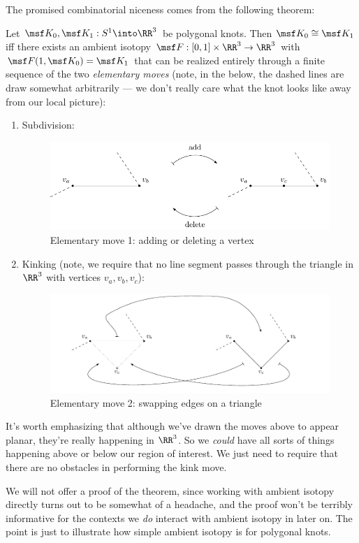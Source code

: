 The promised combinatorial niceness comes from the following theorem:
\begin{theorem}\label{thm:polygonal-ambient-isotopy}
  Let $\msf K_0, \msf K_1 : S^1 \into \RR^3$ be polygonal knots. Then
  $\msf K_0 \cong \msf K_1$ iff there exists an ambient isotopy $\msf
  F : [0,1] \times \RR^3 \to \RR^3$ with $\msf F(1, \msf K_0) = \msf
  K_1$ that can be realized entirely through a finite sequence of the
  two \emph{elementary moves} (note, in the below, the dashed lines
  are draw somewhat arbitrarily --- we don't really care what the knot
  looks like away from our local picture):
  \begin{enumerate}[label=\arabic*)]
    \item Subdivision:
      \begin{figure}[H]
        \centering
        \includegraphics[scale=.85]{figures/fundamentals/el-move-1.pdf}
        \caption[Elementary move 1]{Elementary move 1: adding or
          deleting a vertex}
      \end{figure}
    \item Kinking (note, we require that no line segment passes
      through the triangle in $\RR^3$ with vertices $v_a, v_b, v_c$):
      \begin{figure}[H]
        \centering
        \includegraphics[scale=.85]{figures/fundamentals/el-move-2.pdf}
        \caption[Elementary move 2]{Elementary move 2: swapping edges
          on a triangle}
      \end{figure}
  \end{enumerate}
\end{theorem}
\begin{remark}
  It's worth emphasizing that although we've drawn the moves above to
  appear planar, they're really happening in $\RR^3$. So we
  \emph{could} have all sorts of things happening above or below our
  region of interest. We just need to require that there are no
  obstacles in performing the kink move.
\end{remark}
We will not offer a proof of the theorem, since working with ambient
isotopy directly turns out to be somewhat of a headache, and the proof
won't be terribly informative for the contexts we \emph{do} interact
with ambient isotopy in later on. The point is just to illustrate how
simple ambient isotopy is for polygonal knots.

